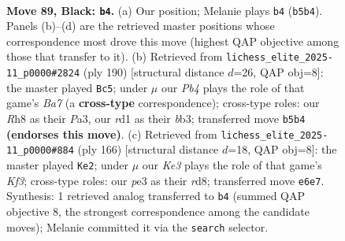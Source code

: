 \documentclass[11pt]{article}
\begin{document}
\begin{figure}[p]\centering
\begin{subfigure}{0.46\textwidth}\centering
\resizebox{\linewidth}{!}{%
\newchessgame
\chessboard[
  setfen={7r/8/p3k3/Ppp2p1p/2p2P1P/4P1P1/1P4K1/3R4 b - - 24 89},
  showmover=false,
  pgfstyle=straightmove, color=movearrow, markmove={b5-b4}
]}
\caption{}
\end{subfigure}\hfill
\begin{subfigure}{0.46\textwidth}\centering
\resizebox{\linewidth}{!}{%
\newchessgame
\chessboard[
  setfen={6k1/B5p1/p4p1p/1p1p3P/3P2P1/PbP1KP2/8/8 w - - 71 96},
  showmover=false,
  pgfstyle=straightmove, color=movearrow, markmove={a7-c5}
]}
\caption{}
\end{subfigure}
\\[4pt]
\begin{subfigure}{0.46\textwidth}\centering
\resizebox{\linewidth}{!}{%
\newchessgame
\chessboard[
  setfen={3r4/1p6/p1p2kp1/P6p/1P3P1P/4PK2/2R5/8 w - - 3 84},
  showmover=false,
  pgfstyle=straightmove, color=movearrow, markmove={f3-e2}
]}
\caption{}
\end{subfigure}\hfill

\caption{\textbf{Move 89, Black: \texttt{b4}.} (a) Our position; Melanie plays \texttt{b4} (\texttt{b5b4}). Panels (b)--(d) are the retrieved master positions whose correspondence most drove this move (highest QAP objective among those that transfer to it). (b) Retrieved from \texttt{lichess\_elite\_2025-11\_p0000\#2824} (ply 190) [structural distance $d$=26, QAP obj=8]: the master played \texttt{Bc5}; under $\mu$ our \emph{Pb4} plays the role of that game's \emph{Ba7} (a \textbf{cross-type} correspondence); cross-type roles: our \emph{R}h8 as their \emph{P}a3, our \emph{r}d1 as their \emph{b}b3; transferred move \texttt{b5b4} \textbf{(endorses this move)}. (c) Retrieved from \texttt{lichess\_elite\_2025-11\_p0000\#884} (ply 166) [structural distance $d$=18, QAP obj=8]: the master played \texttt{Ke2}; under $\mu$ our \emph{Ke3} plays the role of that game's \emph{Kf3}; cross-type roles: our \emph{p}e3 as their \emph{r}d8; transferred move \texttt{e6e7}. Synthesis: 1 retrieved analog transferred to \texttt{b4} (summed QAP objective 8, the strongest correspondence among the candidate moves); Melanie committed it via the \texttt{search} selector.}
\label{fig:thought-m177}
\end{figure}

\clearpage
\end{document}
